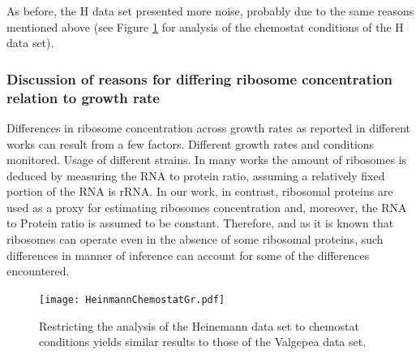 \documentclass[notitlepage]{article}
\begin{document}
As before, the H data set presented more noise, probably due to the same reasons mentioned above (see Figure \ref{fig:growthcorrchemo} for analysis of the chemostat conditions of the H data set).

\subsubsection{Discussion of reasons for differing ribosome concentration relation to growth rate}
\label{ribosomeconc}
Differences in ribosome concentration  across growth rates as reported in different works can result from a few factors.
Different growth rates and conditions monitored.
Usage of different strains.
In many works the amount of ribosomes is deduced by measuring the RNA to protein ratio, assuming a relatively fixed portion of the RNA is rRNA.
In our work, in contrast, ribosomal proteins are used as a proxy for estimating ribosomes concentration and, moreover, the RNA to Protein ratio is assumed to be constant.
Therefore, and as it is known that ribosomes can operate even in the absence of some ribosomal proteins, such differences in manner of inference can account for some of the differences encountered.

\begin{figure}[h]
\centering
\texttt{[image: HeinmannChemostatGr.pdf]}
\caption{
  Restricting the analysis of the Heinemann data set to chemostat conditions yields similar results to those of the Valgepea data set.
}
\label{fig:growthcorrchemo}
\end{figure}

\printbibliography
\end{document}
